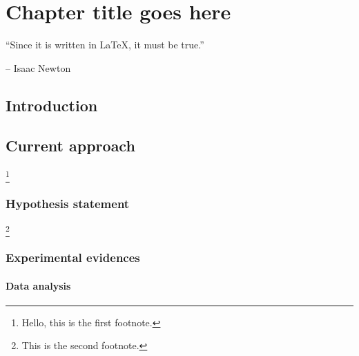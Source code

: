 \chapter{Chapter title goes here} \label{chap:chap-3}



\epigraph{\enquote{Since it is written in \LaTeX, it must be true.}}{-- Isaac Newton}




\section{Introduction}
\blindtext 


\section{Current approach}
\blindtext\footnote{Hello, this is the first footnote.}

\subsection{Hypothesis statement}
\blindtext\footnote{This is the second footnote.}


\subsection{Experimental evidences}
\blindtext


\subsubsection{Data analysis}
\blindtext